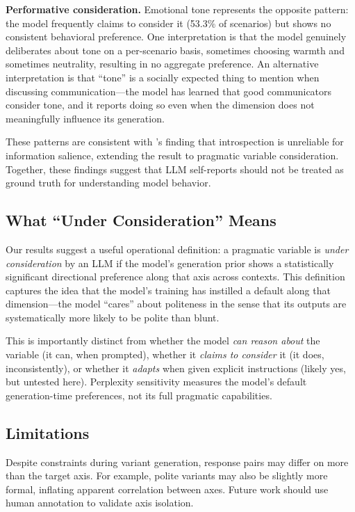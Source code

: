 {\bf Performative consideration.} Emotional tone represents the opposite pattern: the model frequently claims to consider it (53.3\% of scenarios) but shows no consistent behavioral preference. One interpretation is that the model genuinely deliberates about tone on a per-scenario basis, sometimes choosing warmth and sometimes neutrality, resulting in no aggregate preference. An alternative interpretation is that ``tone'' is a socially expected thing to mention when discussing communication---the model has learned that good communicators consider tone, and it reports doing so even when the dimension does not meaningfully influence its generation.

These patterns are consistent with \citet{trienes2025behavioral}'s finding that introspection is unreliable for information salience, extending the result to pragmatic variable consideration. Together, these findings suggest that LLM self-reports should not be treated as ground truth for understanding model behavior.

\subsection{What ``Under Consideration'' Means}
\label{sec:definition}

Our results suggest a useful operational definition: a pragmatic variable is \emph{under consideration} by an LLM if the model's generation prior shows a statistically significant directional preference along that axis across contexts. This definition captures the idea that the model's training has instilled a default along that dimension---the model ``cares'' about politeness in the sense that its outputs are systematically more likely to be polite than blunt.

This is importantly distinct from whether the model \emph{can reason about} the variable (it can, when prompted), whether it \emph{claims to consider} it (it does, inconsistently), or whether it \emph{adapts} when given explicit instructions (likely yes, but untested here). Perplexity sensitivity measures the model's default generation-time preferences, not its full pragmatic capabilities.

\subsection{Limitations}
\label{sec:limitations}

 Despite constraints during variant generation, response pairs may differ on more than the target axis. For example, polite variants may also be slightly more formal, inflating apparent correlation between axes. Future work should use human annotation to validate axis isolation.

